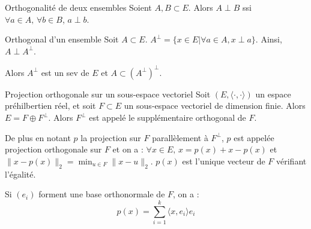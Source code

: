 \begin{definition}{Orthogonalité de deux ensembles}{}
    Soient $A, B \subset E$. Alors $A \perp B$ ssi $\forall a \in A, \, \forall b \in B$,
    $a \perp b$.
\end{definition}

\begin{definition}{Orthogonal d'un ensemble}{}
    Soit $A \subset E$. $A^\perp = \{x \in E | \forall a \in A, x \perp a\}$. 
    Ainsi, $A \perp A^\perp$. 

    Alors $A^\perp$ est un sev de $E$ et $ A \subset (A^\perp)^\perp$.
\end{definition}

\begin{theoreme}{Projection orthogonale sur un sous-espace vectoriel}{}
    Soit $(E, \langle \cdot, \cdot \rangle)$ un espace préhilbertien réel, 
    et soit $F \subset E$ un sous-espace vectoriel de dimension finie. Alors 
    $E = F \oplus F^\perp$. Alors $F^\perp$ est appelé le supplémentaire 
    orthogonal de $F$. 

    De plus en notant $p$ la projection sur $F$ parallèlement à $F^\perp$, $p$ est 
    appelée projection orthogonale sur $F$ et on a : 
    $\forall x \in E, \, x = p(x) + x - p(x)$ et $\| x - p(x) \|_2 = \min_{u \in F} \| x - u \|_2$.
    $p(x)$ est l'unique vecteur de $F$ vérifiant l'égalité. 

    Si $(e_i)$ forment une base orthonormale de $F$, on a : 
    $$ p(x) = \sum_{i = 1}^k \langle x, e_i \rangle e_i$$
\end{theoreme}

